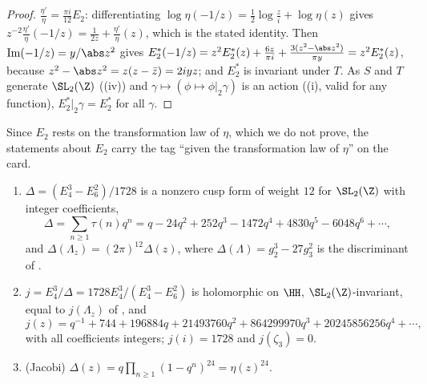 \begin{proof}
$\frac{\eta'}\eta=\frac{\pi i}{12}E_2$: differentiating $\log\eta(-1/z)=\frac12\log\frac zi+\log\eta(z)$ gives $z^{-2}\frac{\eta'}\eta(-1/z)=\frac1{2z}+\frac{\eta'}\eta(z)$, which is the stated
identity. Then $\operatorname{Im}(-1/z)=y/\abs z^2$ gives $E_2^*(-1/z)=z^2E_2^*(z)+\frac{6z}{\pi i}+\frac{3(z^2-\abs z^2)}{\pi y}=z^2E_2^*(z)$, because $z^2-\abs z^2=z(z-\bar z)=2iyz$; and
$E_2^*$ is invariant under $T$. As $S$ and $T$ generate $\SL_2(\Z)$ ((iv)) and $\gamma\mapsto(\phi\mapsto\phi|_2\gamma)$ is an action ((i),
valid for any function), $E_2^*|_2\gamma=E_2^*$ for all $\gamma$.
\end{proof}

Since $E_2$ rests on the transformation law of $\eta$, which we do not prove, the statements about $E_2$ carry the tag ``given the transformation law of
$\eta$'' on the card.

\begin{proposition}\label{prop:modforms:delta-j}
\begin{enumerate}[label=(\roman*)]
\item $\Delta=(E_4^3-E_6^2)/1728$ is a nonzero cusp form of weight $12$ for $\SL_2(\Z)$ with integer coefficients,
\[
\Delta=\sum_{n\ge1}\tau(n)q^n=q-24q^2+252q^3-1472q^4+4830q^5-6048q^6+\cdots,
\]
and $\Delta(\Lambda_z)=(2\pi)^{12}\Delta(z)$, where $\Delta(\Lambda)=g_2^3-27g_3^2$ is the discriminant of .
\item $j=E_4^3/\Delta=1728E_4^3/(E_4^3-E_6^2)$ is holomorphic on $\HH$, $\SL_2(\Z)$-invariant, equal to $j(\Lambda_z)$ of , and
\[
j(z)=q^{-1}+744+196884q+21493760q^2+864299970q^3+20245856256q^4+\cdots,
\]
with all coefficients integers; $j(i)=1728$ and $j(\zeta_3)=0$.
\item (Jacobi) $\Delta(z)=q\prod_{n\ge1}(1-q^n)^{24}=\eta(z)^{24}$.
\end{enumerate}
\end{proposition}

